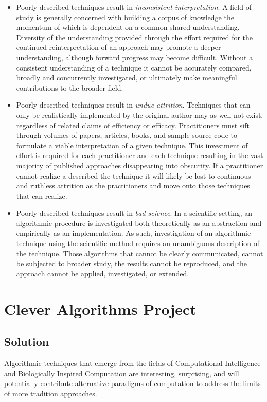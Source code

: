 \documentclass[a4paper, 11pt]{article}
\begin{document}
\begin{itemize}
	\item Poorly described techniques result in \emph{inconsistent interpretation}. A field of study is generally concerned with building a corpus of knowledge the momentum of which is dependent on a common shared understanding. Diversity of the understanding provided through the effort required for the continued reinterpretation of an approach may promote a deeper understanding, although forward progress may become difficult. Without a consistent understanding of a technique it cannot be accurately compared, broadly and concurrently investigated, or ultimately make meaningful contributions to the broader field. 
	\item Poorly described techniques result in \emph{undue attrition}. Techniques that can only be realistically implemented by the original author may as well not exist, regardless of related claims of efficiency or efficacy. Practitioners must sift through volumes of papers, articles, books, and sample source code to formulate a viable interpretation of a given technique. This investment of effort is required for each practitioner and each technique resulting in the vast majority of published approaches disappearing into obscurity. If a practitioner cannot realize a described the technique it will likely be lost to continuous and ruthless attrition as the practitioners and move onto those techniques that can realize.
	\item Poorly described techniques result in \emph{bad science}. In a scientific setting, an algorithmic procedure is investigated both theoretically as an abstraction and empirically as an implementation. As such, investigation of an algorithmic technique using the scientific method requires an unambiguous description of the technique. Those algorithms that cannot be clearly communicated, cannot be subjected to broader study, the results cannot be reproduced, and the approach cannot be applied, investigated, or extended. 
\end{itemize}

\section{Clever Algorithms Project}

\subsection{Solution}
Algorithmic techniques that emerge from the fields of Computational Intelligence and Biologically Inspired Computation are interesting, surprising, and will potentially contribute alternative paradigms of computation to address the limits of more tradition approaches. 
\end{document}
